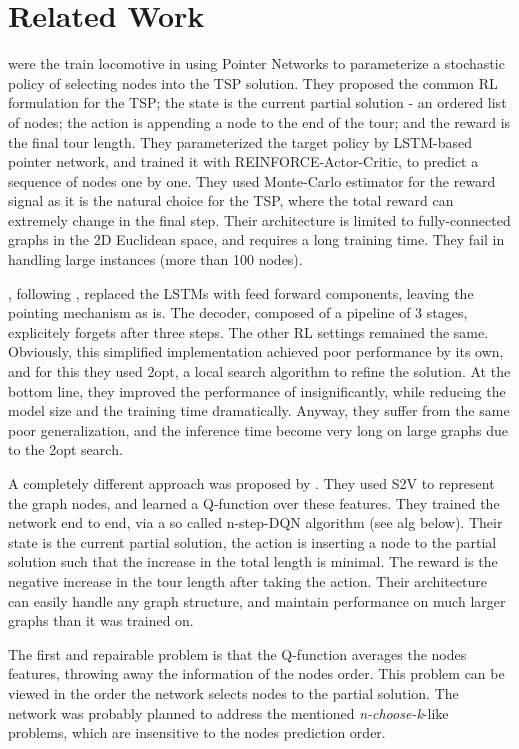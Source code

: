 \documentclass[10pt,a4paper,draft]{article}
\begin{document}
\section{Related Work}
\cite{bello16-tsp-pnac} were the train locomotive in using Pointer Networks to parameterize a stochastic policy of selecting nodes into the TSP solution. They proposed the common RL formulation for the TSP; the state is the current partial solution - an ordered list of nodes; the action is appending a node to the end of the tour; and the reward is the final tour length. They parameterized the target policy by LSTM-based pointer network, and trained it with REINFORCE-Actor-Critic, to predict a sequence of nodes one by one. They used Monte-Carlo estimator for the reward signal as it is the natural choice for the TSP, where the total reward can extremely change in the final step. Their architecture is limited to fully-connected graphs in the 2D Euclidean space, and requires a long training time. They fail in handling large instances (more than 100 nodes).

\cite{deudon18-tsp-nr2opt}, following \cite{bello16-tsp-pnac}, replaced the LSTMs with feed forward components, leaving the pointing mechanism as is. The decoder, composed of a pipeline of 3 stages, explicitely forgets after three steps. The other RL settings remained the same. Obviously, this simplified implementation achieved poor performance by its own, and for this they used 2opt, a local search algorithm to refine the solution. At the bottom line, they improved the performance of \cite{bello16-tsp-pnac} insignificantly, while reducing the model size and the training time dramatically. Anyway, they suffer from the same poor generalization, and the inference time become very long on large graphs due to the 2opt search.

A completely different approach was proposed by \cite{dai17-tsp-s2v}. They used S2V \cite{dai16-s2v} to represent the graph nodes, and learned a Q-function over these features. They trained the network end to end, via a so called n-step-DQN algorithm (see alg below). Their state is the current partial solution, the action is inserting a node to the partial solution such that the increase in the total length is minimal. The reward is the negative increase in the tour length after taking the action. Their architecture can easily handle any graph structure, and maintain performance on much larger graphs than it was trained on. 

The first and repairable problem is that the Q-function averages the nodes features, throwing away the information of the nodes order. This problem can be viewed in the order the network selects nodes to the partial solution. The network was probably planned to address the mentioned \textit{n-choose-k}-like problems, which are insensitive to the nodes prediction order.
\end{document}

